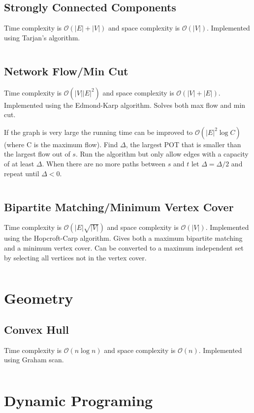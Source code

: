 \documentclass[8pt,a4paper,landscape,oneside]{amsart}
\newcommand{\code}[1]{\inputminted[fontsize=\normalsize,baselinestretch=1]{java}{code/#1}}
\newcommand{\bigO}{\mathcal{O}}
\begin{document}
\begin{multicols*}{3}
  \subsection{Strongly Connected Components}
  Time complexity is $\bigO(|E| + |V|)$ and space complexity is $\bigO(|V|)$. Implemented using Tarjan's algorithm.
  \code{Graphs/StronglyConnectedComponents.java}
  
  \subsection{Network Flow/Min Cut}
  Time complexity is $\bigO(|V||E|^2)$ and space complexity is $\bigO(|V|+|E|)$. Implemented using the Edmond-Karp algorithm. Solves both max flow and min cut.
  
  If the graph is very large the running time can be improved to $\bigO(|E|^2 \log{C})$ (where C is the maximum flow). Find $\Delta$, the largest POT that is smaller than the largest flow out of $s$. Run the algorithm but only allow edges with a capacity of at least $\Delta$. When there are no more paths between $s$ and $t$ let $\Delta = \Delta / 2$ and repeat until $\Delta < 0$.
  \code{Graphs/NetworkFlow.java}
  
  \subsection{Bipartite Matching/Minimum Vertex Cover}
  Time complexity is $\bigO(|E|\sqrt{|V|})$ and space complexity is $\bigO(|V|)$. Implemented using the Hopcroft-Carp algorithm. Gives both a maximum bipartite matching and a minimum vertex cover. Can be converted to a maximum independent set by selecting all vertices not in the vertex cover.
  \code{Graphs/HopcroftCarp.java}
  
  
\section{Geometry}
  \subsection{Convex Hull}
  Time complexity is $\bigO(n\log{n})$ and space complexity is $\bigO(n)$. Implemented using Graham scan.
  \code{Geometry/GrahamScan.java}
  
\section{Dynamic Programing}

\end{multicols*}
\end{document}
